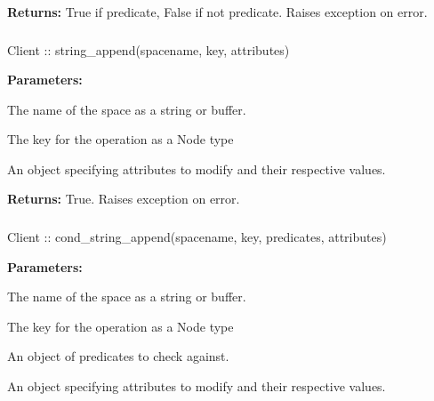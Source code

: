 \noindent\textbf{Returns:}
True if predicate, False if not predicate.  Raises exception on error.

\subsubsection{}
\label{api:nodejs:string_append}
\begin{javascriptcode}
Client :: string_append(spacename, key, attributes)
\end{javascriptcode}
\funcdesc 

\noindent\textbf{Parameters:}
\begin{description}[labelindent=\widthof{{\code{attributes}}},leftmargin=*,noitemsep,nolistsep,align=right]
\item[\code{spacename}] The name of the space as a string or buffer.
\item[\code{key}] The key for the operation as a Node type
\item[\code{attributes}] An object specifying attributes to modify and their respective values.
\end{description}

\noindent\textbf{Returns:}
True.  Raises exception on error.

\subsubsection{}
\label{api:nodejs:cond_string_append}
\begin{javascriptcode}
Client :: cond_string_append(spacename, key, predicates, attributes)
\end{javascriptcode}
\funcdesc 

\noindent\textbf{Parameters:}
\begin{description}[labelindent=\widthof{{\code{predicates}}},leftmargin=*,noitemsep,nolistsep,align=right]
\item[\code{spacename}] The name of the space as a string or buffer.
\item[\code{key}] The key for the operation as a Node type
\item[\code{predicates}] An object of predicates to check against.
\item[\code{attributes}] An object specifying attributes to modify and their respective values.
\end{description}

